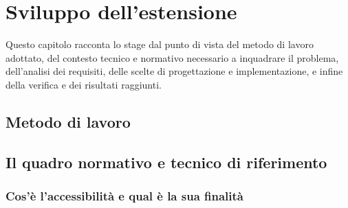 \chapter{Sviluppo dell'estensione}
\label{chap:sviluppo-estensione}

Questo capitolo racconta lo stage dal punto di vista del metodo di lavoro adottato, del contesto tecnico e normativo necessario a inquadrare il problema, dell'analisi dei requisiti, delle scelte di progettazione e implementazione, e infine della verifica e dei risultati raggiunti.

\section{Metodo di lavoro}
\label{sec:metodo-lavoro}



\section{Il quadro normativo e tecnico di riferimento}
\label{sec:quadro-normativo}

\subsection{Cos'è l'accessibilità e qual è la sua finalità}
\label{subsec:cose-accessibilita}

